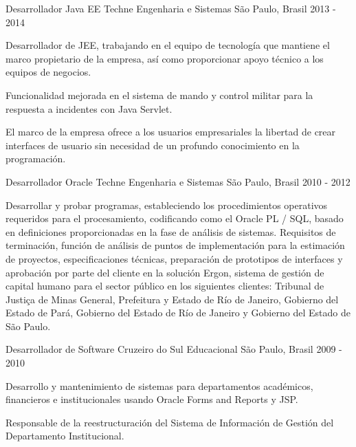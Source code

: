 \begin{cventries}
  \cventry
    {Desarrollador Java EE} %
    {Techne Engenharia e Sistemas} %
    {São Paulo, Brasil} %
    {2013 - 2014} %
    {
      \begin{cvitems} %
        \item {Desarrollador de JEE, trabajando en el equipo de tecnología que mantiene el marco propietario de la empresa, así como proporcionar apoyo técnico a los equipos de negocios.}
        \item {Funcionalidad mejorada en el sistema de mando y control militar para la respuesta a incidentes con Java Servlet.}
        \item {El marco de la empresa ofrece a los usuarios empresariales la libertad de crear interfaces de usuario sin necesidad de un profundo conocimiento en la programación.}
      \end{cvitems}
    }

  \cventry
    {Desarrollador Oracle} %
    {Techne Engenharia e Sistemas} %
	{São Paulo, Brasil} %
    {2010 - 2012} %
    {
      \begin{cvitems} %
        \item {Desarrollar y probar programas, estableciendo los procedimientos operativos requeridos para el procesamiento, codificando como el Oracle PL / SQL, basado en definiciones proporcionadas en la fase de análisis de sistemas.
Requisitos de terminación, función de análisis de puntos de implementación para la estimación de proyectos, especificaciones técnicas, preparación de prototipos de interfaces y aprobación por parte del cliente en la solución Ergon, sistema de gestión de capital humano para el sector público en los siguientes clientes: Tribunal de Justiça de Minas General, Prefeitura y Estado de Río de Janeiro, Gobierno del Estado de Pará, Gobierno del Estado de Río de Janeiro y Gobierno del Estado de São Paulo.}
      \end{cvitems}
    }

  \cventry
    {Desarrollador de Software} %
    {Cruzeiro do Sul Educacional} %
    {São Paulo, Brasil} %
    {2009 - 2010} %
    {
      \begin{cvitems} %
        \item {Desarrollo y mantenimiento de sistemas para departamentos académicos, financieros e institucionales usando Oracle Forms and Reports y JSP.}
        \item {Responsable de la reestructuración del Sistema de Información de Gestión del Departamento Institucional.}
      \end{cvitems}
    }


\end{cventries}
